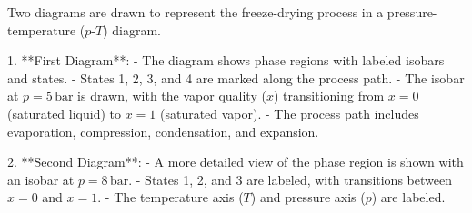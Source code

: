 Two diagrams are drawn to represent the freeze-drying process in a pressure-temperature (\(p\)-\(T\)) diagram.  

1. **First Diagram**:  
   - The diagram shows phase regions with labeled isobars and states.  
   - States 1, 2, 3, and 4 are marked along the process path.  
   - The isobar at \(p = 5 \, \text{bar}\) is drawn, with the vapor quality (\(x\)) transitioning from \(x = 0\) (saturated liquid) to \(x = 1\) (saturated vapor).  
   - The process path includes evaporation, compression, condensation, and expansion.  

2. **Second Diagram**:  
   - A more detailed view of the phase region is shown with an isobar at \(p = 8 \, \text{bar}\).  
   - States 1, 2, and 3 are labeled, with transitions between \(x = 0\) and \(x = 1\).  
   - The temperature axis (\(T\)) and pressure axis (\(p\)) are labeled.